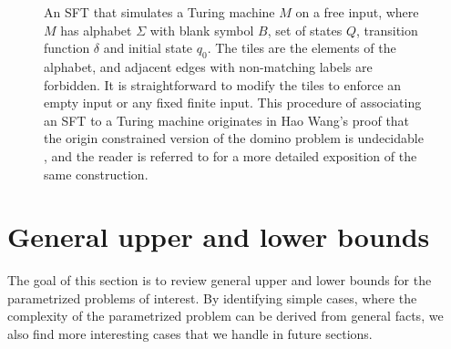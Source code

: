 \documentclass[a4paper]{article}
\theoremstyle{definition}
\begin{document}
\begin{figure}[h]
    \caption{An SFT that simulates a Turing machine $M$ on a free input, where $M$ has alphabet $\Sigma$ with blank symbol $B$, set of states $Q$, transition function $\delta$ and initial state $q_0$. The tiles are the elements of the alphabet, and adjacent edges with non-matching labels are forbidden. 
    It is straightforward to modify the tiles to enforce an empty input or any fixed finite input.
    This procedure of associating an SFT to a Turing machine originates in Hao Wang's proof that the origin constrained version of the domino problem is undecidable \cite{wang_proving_1961}, and the reader is referred to \cite{jeandel_undecidability_2020} for a more detailed exposition of the same construction. }
    \label{fig:computationtiles}
\end{figure}

\section{General upper and lower bounds}\label{sec:general-results}
The goal of this section is to review general upper and lower bounds for the parametrized problems of interest. By identifying simple cases, where the complexity of the parametrized problem can be derived from general facts, we also find more interesting cases that we handle in future sections. 
\end{document}
